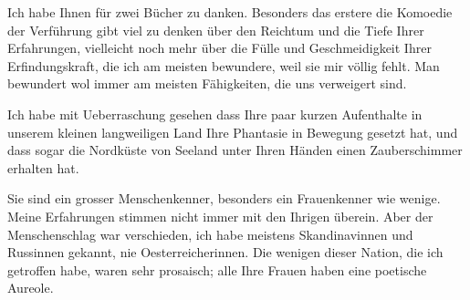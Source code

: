 \pstart
           Ich habe Ihnen für zwei Bücher zu danken. Besonders das erstere die Komoedie der Verführung gibt viel zu denken über den Reichtum und die Tiefe
               Ihrer Erfahrungen, vielleicht noch mehr über die Fülle und Geschmeidigkeit Ihrer
               Erfindungskraft, die ich am meisten bewundere, weil sie mir völlig fehlt. Man
               bewundert {\pb}wol immer am meisten
               Fähigkeiten, die uns verweigert sind.\pend
           
\pstart
           Ich habe mit Ueberraschung gesehen dass Ihre paar kurzen Aufenthalte in unserem
               kleinen langweiligen Land
               Ihre Phantasie in Bewegung gesetzt hat, und dass sogar die Nordküste von Seeland unter Ihren Händen einen Zauberschimmer erhalten hat.\pend
           
\pstart
           Sie sind ein grosser Menschenkenner, besonders ein Frauenkenner wie wenige. Meine
               Erfahrungen stimmen nicht immer mit den Ihrigen überein. Aber der Menschenschlag war
               verschieden, ich habe meistens Skandinavinnen und
                  Russinnen gekannt, nie Oesterreicherinnen. Die wenigen dieser Nation, die ich getroffen
               habe, waren sehr prosaisch; alle Ihre Frauen haben eine poetische Aureole.\pend
           
